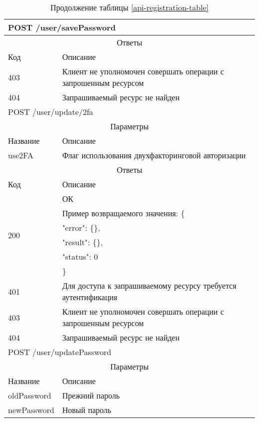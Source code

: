 \begin{table}[H]
  \caption*{Продолжение таблицы \ref{api-registration-table}}
  \begin{tabular}{|p{6cm}|p{10cm}|}
  \hline \multicolumn{2}{|l|}{POST /user/savePassword} \\
  \hline \multicolumn{2}{|c|}{Ответы} \\
  \hline Код & Описание \\
  \hline 403 & Клиент не уполномочен совершать операции с запрошенным ресурсом \\
  \hline 404 & Запрашиваемый ресурс не найден \\
  \hline \multicolumn{2}{|l|}{POST /user/update/2fa} \\
  \hline \multicolumn{2}{|c|}{Параметры} \\
  \hline Название & Описание \\
  \hline use2FA & Флаг использования двухфакторинговой авторизации \\
  \hline \multicolumn{2}{|c|}{Ответы} \\
  \hline Код & Описание \\
  \hline \multirow{6}{=}{200} & ОК \\
   & Пример возвращаемого значения: \{ \\
   & "error": \{\}, \\
   & "result": \{\}, \\
   & "status": 0 \\
   & \} \\
  \hline 401 & Для доступа к запрашиваемому ресурсу требуется аутентификация \\
  \hline 403 & Клиент не уполномочен совершать операции с запрошенным ресурсом \\
  \hline 404 & Запрашиваемый ресурс не найден \\
  \hline \multicolumn{2}{|l|}{POST /user/updatePassword} \\
  \hline \multicolumn{2}{|c|}{Параметры} \\
  \hline Название & Описание \\
  \hline oldPassword & Прежний пароль \\
  \hline newPassword & Новый пароль \\
  \end{tabular}
\end{table}
